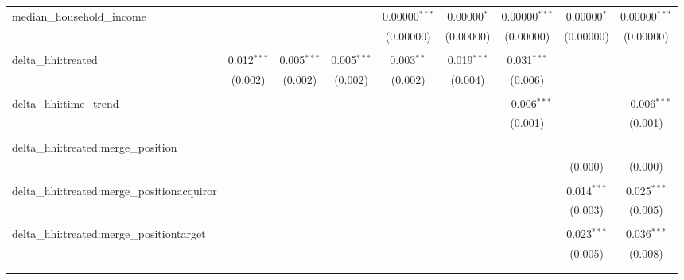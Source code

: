 \begin{table}[H]
{\begin{tabular}{@{\extracolsep{5pt}}lcccccccc}
  median\_household\_income &  &  &  & 0.00000$^{***}$ & 0.00000$^{*}$ & 0.00000$^{***}$ & 0.00000$^{*}$ & 0.00000$^{***}$ \\  

   &  &  &  & (0.00000) & (0.00000) & (0.00000) & (0.00000) & (0.00000) \\  

   & & & & & & & & \\  

  delta\_hhi:treated & 0.012$^{***}$ & 0.005$^{***}$ & 0.005$^{***}$ & 0.003$^{**}$ & 0.019$^{***}$ & 0.031$^{***}$ &  &  \\  

   & (0.002) & (0.002) & (0.002) & (0.002) & (0.004) & (0.006) &  &  \\  

   & & & & & & & & \\  

  delta\_hhi:time\_trend &  &  &  &  &  & $-$0.006$^{***}$ &  & $-$0.006$^{***}$ \\  

   &  &  &  &  &  & (0.001) &  & (0.001) \\  

   & & & & & & & & \\  

  delta\_hhi:treated:merge\_position &  &  &  &  &  &  &  &  \\  

   &  &  &  &  &  &  & (0.000) & (0.000) \\  

   & & & & & & & & \\  

  delta\_hhi:treated:merge\_positionacquiror &  &  &  &  &  &  & 0.014$^{***}$ & 0.025$^{***}$ \\  

   &  &  &  &  &  &  & (0.003) & (0.005) \\  

   & & & & & & & & \\  

  delta\_hhi:treated:merge\_positiontarget &  &  &  &  &  &  & 0.023$^{***}$ & 0.036$^{***}$ \\  

   &  &  &  &  &  &  & (0.005) & (0.008) \\  

   & & & & & & & & \\  

 \hline \\[-1.8ex]  


\end{tabular}}
\end{table}
